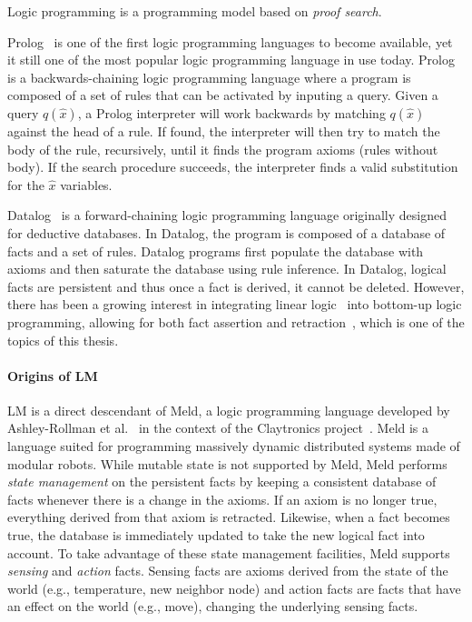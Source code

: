 Logic programming is a programming model based on \emph{proof search}.

Prolog~\cite{Colmerauer:1993:BP:154766.155362} is one of the first logic
programming languages to become available, yet it still one of the most popular
logic programming language in use today. Prolog is a backwards-chaining logic
programming language where a program is composed of a set of rules that can be
activated by inputing a query. Given a query $q(\hat{x})$, a Prolog interpreter
will work backwards by matching $q(\hat{x})$ against the head of a rule. If
found, the interpreter will then try to match the body of the rule, recursively,
until it finds the program axioms (rules without body). If the search procedure
succeeds, the interpreter finds a valid substitution for the $\hat{x}$
variables.

Datalog~\cite{Ramakrishnan93asurvey} is a forward-chaining logic programming
language originally designed for deductive databases. In Datalog, the program is
composed of a database of facts and a set of rules. Datalog programs first
populate the database with axioms and then saturate the database using rule
inference. In Datalog, logical facts are persistent and thus once a fact is
derived, it cannot be deleted. However, there has been a growing interest in
integrating linear logic~\cite{girard-87} into bottom-up logic programming,
allowing for both fact assertion and
retraction~\cite{Chang03ajudgmental,Lopez:2005:MCL:1069774.1069778,simmons-lla,cruz-iclp14},
which is one of the topics of this thesis.

\paragraph{Origins of LM}

LM is a direct descendant of Meld, a logic programming language developed by
Ashley-Rollman et
al.~\cite{ashley-rollman-iclp09,ashley-rollman-derosa-iros07wksp} in the context
of the Claytronics project~\cite{goldstein-computer05}. Meld is a language
suited for programming massively dynamic distributed systems made of modular
robots. While mutable state is not supported by Meld, Meld performs \emph{state
management} on the persistent facts by keeping a consistent database of facts
whenever there is a change in the axioms. If an axiom is no longer true,
everything derived from that axiom is retracted. Likewise, when a fact becomes
true, the database is immediately updated to take the new logical fact into
account. To take advantage of these state management facilities, Meld supports
\emph{sensing} and \emph{action} facts. Sensing facts are axioms derived from
the state of the world (e.g., temperature, new neighbor node) and action facts
are facts that have an effect on the world (e.g., move), changing the underlying
sensing facts.

